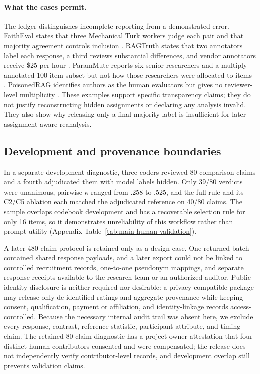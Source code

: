 \documentclass[11pt]{article}
\begin{document}
\paragraph{What the cases permit.}
The ledger distinguishes incomplete reporting from a demonstrated error.
FaithEval states that three Mechanical Turk workers judge each pair and that
majority agreement controls inclusion \citep{rrag040}. RAGTruth states that
two annotators label each response, a third reviews substantial differences,
and vendor annotators receive \$25 per hour \citep{ragTruth2024}. ParamMute
reports six senior researchers and a multiply annotated 100-item subset but
not how those researchers were allocated to items \citep{rrag024}.
PoisonedRAG identifies authors as the human evaluators but gives no
reviewer-level multiplicity \citep{poisonedRAG2024}. These examples support
specific transparency claims; they do not justify reconstructing hidden
assignments or declaring any analysis invalid. They also show why releasing
only a final majority label is insufficient for later assignment-aware
reanalysis.

\subsection{Development and provenance boundaries}

In a separate development diagnostic, three coders reviewed 80 comparison
claims and a fourth adjudicated them with model labels hidden. Only 39/80
verdicts were unanimous, pairwise \(\kappa\) ranged from .258 to .525, and the
full rule and its C2/C5 ablation each matched the adjudicated reference on
40/80 claims. The sample overlaps codebook development and has a recoverable
selection rule for only 16 items, so it demonstrates unreliability of this
workflow rather than prompt utility (Appendix
Table~\ref{tab:main-human-validation}).

A later 480-claim protocol is retained only as a design case. One returned
batch contained shared response payloads, and a later export could not be
linked to controlled recruitment records, one-to-one pseudonym mappings, and
separate response receipts available to the research team or an authorized
auditor. Public identity disclosure is neither required nor desirable: a
privacy-compatible package may release only de-identified ratings and
aggregate provenance while keeping consent, qualification, payment or
affiliation, and identity-linkage records access-controlled. Because the
necessary internal audit trail was absent here, we exclude every response,
contrast, reference statistic, participant attribute, and timing claim. The
retained 80-claim diagnostic has a project-owner attestation that four
distinct human contributors consented and were compensated; the release does
not independently verify contributor-level records, and development overlap
still prevents validation claims.
\end{document}
